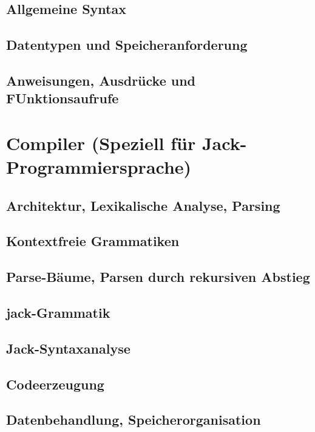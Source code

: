 \documentclass[12pt]{report}
\begin{document}
\subsection{Allgemeine Syntax}
\subsection{Datentypen und Speicheranforderung}
\subsection{Anweisungen, Ausdrücke und FUnktionsaufrufe}

\section{Compiler (Speziell für Jack-Programmiersprache)}
\subsection{Architektur, Lexikalische Analyse, Parsing}
\subsection{Kontextfreie Grammatiken}
\subsection{Parse-Bäume, Parsen durch rekursiven Abstieg}
\subsection{jack-Grammatik}
\subsection{Jack-Syntaxanalyse}
\subsection{Codeerzeugung}
\subsection{Datenbehandlung, Speicherorganisation}



\end{document}
